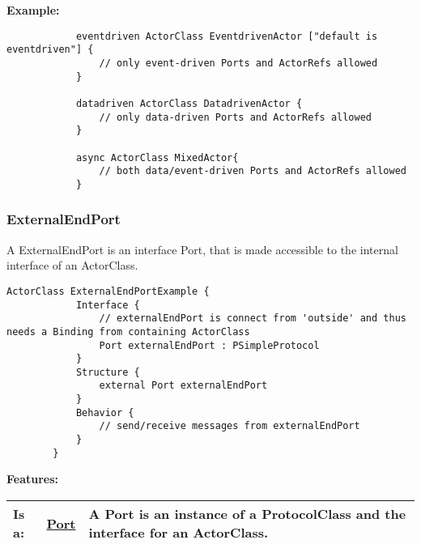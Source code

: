 		\textbf{Example:}
		
			\begin{lstlisting}
			eventdriven ActorClass EventdrivenActor ["default is eventdriven"] {
				// only event-driven Ports and ActorRefs allowed
			}
			
			datadriven ActorClass DatadrivenActor {
				// only data-driven Ports and ActorRefs allowed
			}
			
			async ActorClass MixedActor{
				// both data/event-driven Ports and ActorRefs allowed
			}
			\end{lstlisting}
	
	\vspace{\baselineskip}
	\vspace{\baselineskip}
	\vspace{\baselineskip}
	
	\subsubsection{ExternalEndPort}
		\hypertarget{ref:ExternalEndPort}{}
		
		A ExternalEndPort is an interface Port, that is made accessible to the internal interface of an ActorClass.
		
		\begin{lstlisting}[language=ROOM]
		ActorClass ExternalEndPortExample {
			Interface {
				// externalEndPort is connect from 'outside' and thus needs a Binding from containing ActorClass
				Port externalEndPort : PSimpleProtocol
			}
			Structure {
				external Port externalEndPort
			}
			Behavior {
				// send/receive messages from externalEndPort
			}
		}
		\end{lstlisting}
		
		
		\begingroup
		\textbf{Features:}
		\renewcommand{\arraystretch}{1.8} %
		\begin{longtable}{l|l p{}}
			\hline
		Is a: & \tabitem \hyperlink{ref:Port}{Port}  & A Port is an instance of a ProtocolClass and the interface for an ActorClass.\\
		\hline
		\end{longtable}
		\endgroup
		
		
		
	\vspace{\baselineskip}
	\vspace{\baselineskip}
	\vspace{\baselineskip}
	
